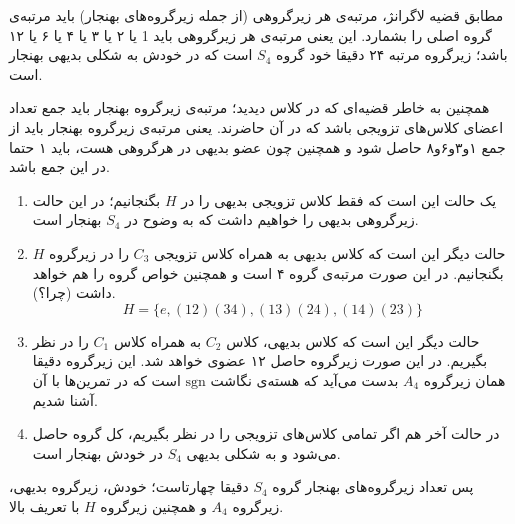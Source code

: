 \documentclass[a4paper, 12pt]{article}
\begin{document}
مطابق قضیه لاگرانژ، مرتبه‌ی هر زیرگروهی (از جمله زیرگروه‌های بهنجار) باید مرتبه‌ی گروه اصلی را بشمارد. این یعنی مرتبه‌ی هر زیرگروهی باید 1 یا ۲ یا ۳ یا ۴ یا ۶ یا ۱۲ باشد؛ زیرگروه مرتبه ۲۴ دقیقا خود گروه $S_4$ است که در خودش به شکلی بدیهی بهنجار است.

همچنین به خاطر قضیه‌ای که در کلاس دیدید؛ مرتبه‌ی زیرگروه بهنجار باید جمع تعداد اعضای کلاس‌های تزویجی باشد که در آن حاضرند. یعنی مرتبه‌ی زیرگروه بهنجار باید از جمع ۱و۳و۶و۸ حاصل شود و همچنین چون عضو بدیهی در هرگروهی هست، باید ۱ حتما در این جمع باشد.

\begin{enumerate}
	\item یک حالت این است که فقط کلاس تزویجی بدیهی را در $H$ بگنجانیم؛ در این حالت زیرگروهی بدیهی را خواهیم داشت که به وضوح در $S_4$ بهنجار است.
	\item
	حالت دیگر این است که کلاس بدیهی به همراه کلاس تزویجی $C_3$ را در زیرگروه $H$ بگنجانیم. در این صورت مرتبه‌ی گروه ۴ است و همچنین خواص گروه را هم خواهد داشت (چرا؟).
	\[H = \{e , (12)(34),(13)(24),(14)(23)\}\]
	\item حالت دیگر این است که کلاس بدیهی، کلاس 
	$C_2$ به همراه کلاس 
	$C_1$ را در نظر بگیریم. 
	در این صورت زیرگروه حاصل ۱۲ عضوی خواهد شد. این زیرگروه دقیقا همان زیرگروه 
	$A_4$ بدست می‌آید که هسته‌ی نگاشت 
	$\text{sgn}$
	است که در تمرین‌ها با آن آشنا شدیم.
	\item  در حالت آخر هم اگر تمامی کلاس‌های تزویجی را در نظر بگیریم، کل گروه حاصل می‌شود و به شکلی بدیهی
	$S_4$ در خودش بهنجار است.
\end{enumerate}
 پس تعداد زیرگروه‌های بهنجار گروه 
 $S_4$
 دقیقا چهارتاست؛ خودش، زیرگروه بدیهی، زیرگروه 
 $A_4$ و همچنین زیرگروه 
 $H$ با تعریف بالا.
\end{document}
